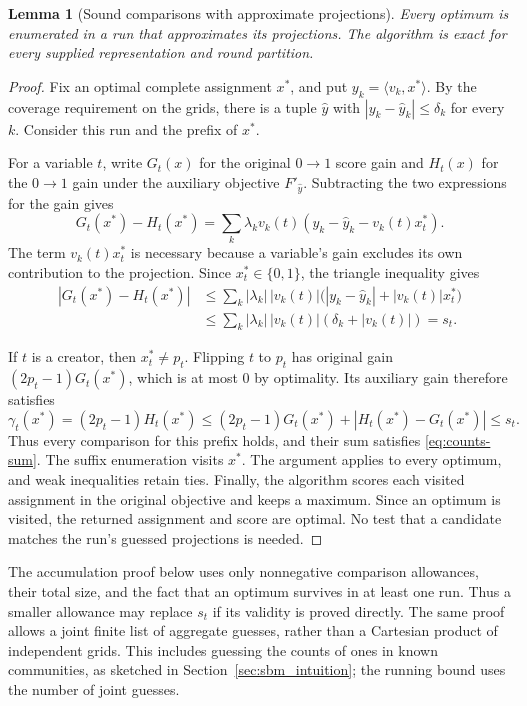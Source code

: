 \documentclass[11pt,a4paper]{article}
\newtheorem{lemma}[theorem]{Lemma}
\theoremstyle{definition}
\theoremstyle{remark}
\begin{document}
\begin{lemma}[Sound comparisons with approximate projections]\label{lem:counts-exact}
Every optimum is enumerated in a run that approximates its projections.
The algorithm is exact for every supplied representation and round partition.
\end{lemma}
\begin{proof}
Fix an optimal complete assignment $x^*$, and put
$y_k=\langle v_k,x^*\rangle$. By the coverage requirement on the grids,
there is a tuple $\hat y$ with $|y_k-\hat y_k|\le\delta_k$ for every $k$.
Consider this run and the prefix of $x^*$.

For a variable $t$, write $G_t(x)$ for the original $0\to1$ score gain
and $H_t(x)$ for the $0\to1$ gain under the auxiliary objective
$F'_{\hat y}$. Subtracting the two expressions for the gain gives
\[
 G_t(x^*)-H_t(x^*)
 =\sum_k\lambda_kv_k(t)(y_k-\hat y_k-v_k(t)x_t^*).
\]
The term $v_k(t)x_t^*$ is necessary because a variable's gain excludes
its own contribution to the projection. Since $x_t^*\in\{0,1\}$,
the triangle inequality gives
\begin{align*}
 |G_t(x^*)-H_t(x^*)|
 &\le\sum_k|\lambda_k|\,|v_k(t)|
       \bigl(|y_k-\hat y_k|+|v_k(t)|x_t^*\bigr)\\
 &\le\sum_k|\lambda_k|\,|v_k(t)|
       (\delta_k+|v_k(t)|)=s_t.
\end{align*}

If $t$ is a creator, then $x_t^*\ne p_t$. Flipping $t$ to $p_t$
has original gain $(2p_t-1)G_t(x^*)$, which is at most $0$ by optimality.
Its auxiliary gain therefore satisfies
\[
 \gamma_t(x^*)=(2p_t-1)H_t(x^*)
 \le (2p_t-1)G_t(x^*)+|H_t(x^*)-G_t(x^*)|
 \le s_t.
\]
Thus every comparison for this prefix holds, and their sum satisfies
\eqref{eq:counts-sum}. The suffix enumeration visits $x^*$.
The argument applies to every optimum, and weak inequalities retain ties.
Finally, the algorithm scores each visited assignment in the original
objective and keeps a maximum. Since an optimum is visited, the returned
assignment and score are optimal. No test that a candidate matches the
run's guessed projections is needed.
\end{proof}

The accumulation proof below uses only nonnegative comparison allowances,
their total size, and the fact that an optimum survives in at least one
run. Thus a smaller allowance may replace $s_t$ if its validity is proved
directly. The same proof allows a joint finite list of aggregate guesses,
rather than a Cartesian product of independent grids. This includes guessing the counts of
ones in known communities, as sketched in Section~\ref{sec:sbm_intuition}; the running bound uses
the number of joint guesses.
\end{document}
